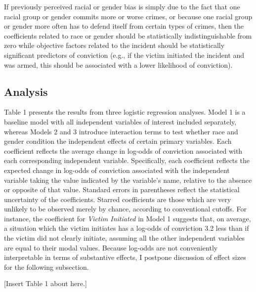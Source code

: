 \documentclass[12pt,article]{article}
\begin{document}
If previously perceived racial or gender bias is simply due to the fact
that one racial group or gender commits more or worse crimes, or because
one racial group or gender more often has to defend itself from certain
types of crimes, then the coefficients related to race or gender should
be statistically indistinguishable from zero while objective factors
related to the incident should be statistically significant predictors
of conviction (e.g., if the victim initiated the incident and was armed,
this should be associated with a lower likelihood of conviction).

\subsection{Analysis}\label{analysis}

Table 1 presents the results from three logistic regression analyses.
Model 1 is a baseline model with all independent variables of interest
included separately, whereas Models 2 and 3 introduce interaction terms
to test whether race and gender condition the independent effects of
certain primary variables. Each coefficient reflects the average change
in log-odds of conviction associated with each corresponding independent
variable. Specifically, each coefficient reflects the expected change in
log-odds of conviction associated with the independent variable taking
the value indicated by the variable's name, relative to the absence or
opposite of that value. Standard errors in parentheses reflect the
statistical uncertainty of the coefficients. Starred coefficients are
those which are very unlikely to be observed merely by chance, according
to conventional cutoffs. For instance, the coefficient for \emph{Victim
Initiated} in Model 1 suggests that, on average, a situation which the
victim initiates has a log-odds of conviction 3.2 less than if the
victim did not clearly initiate, assuming all the other independent
variables are equal to their modal values. Because log-odds are not
conveniently interpretable in terms of substantive effects, I postpone
discussion of effect sizes for the following subsection.

{[}Insert Table 1 about here.{]}
\end{document}
